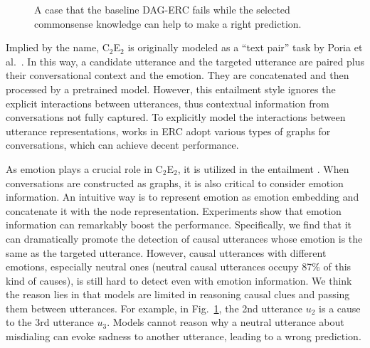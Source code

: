 \documentclass{article}
\begin{document}
\begin{figure}
    \centering
    \caption{A case that the baseline DAG-ERC fails while the selected commonsense knowledge can help to make a right prediction. }
    \label{case}
    \vspace{-0.2cm}
\end{figure}

Implied by the name, C$_2$E$_2$ is originally modeled as a ``text pair'' task by Poria et al.~. In this way, a candidate utterance and the targeted utterance are paired plus their conversational context and the emotion. They are concatenated and then processed by a pretrained model. However, this entailment style ignores the explicit interactions between utterances, thus contextual information from conversations not fully captured. To explicitly model the interactions between utterance representations, works \cite{DialogueGCN,DAG} in ERC adopt various types of graphs for conversations, which can achieve decent performance. 

As emotion plays a crucial role in C$_2$E$_2$, it is utilized in the entailment \cite{RECCON}. When conversations are constructed as graphs, it is also critical to consider emotion information. An intuitive way is to represent emotion as emotion embedding \cite{Liang} and concatenate it with the node representation. Experiments show that emotion information can remarkably boost the performance. Specifically, we find that it can dramatically promote the detection of causal utterances whose emotion is the same as the targeted utterance. However, causal utterances with different emotions, especially neutral ones (neutral causal utterances occupy 87$\%$ of this kind of causes), is still hard to detect even with emotion information. We think the reason lies in that models are limited in reasoning causal clues and passing them between utterances. For example, in Fig.~\ref{case}, the 2nd utterance $u_{2}$ is a cause to the 3rd utterance $u_{3}$. Models cannot reason why a neutral utterance about misdialing can evoke sadness to another utterance, leading to a wrong prediction. 
\end{document}
